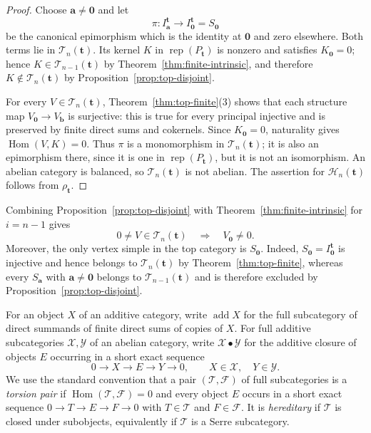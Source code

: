 \documentclass[12pt,reqno]{amsart}
\theoremstyle{definition}
\theoremstyle{remark}
\newcommand{\Rep}{\operatorname{rep}}
\newcommand{\Hom}{\operatorname{Hom}}
\begin{document}
\begin{proof}
Choose $\mathbf a\ne\mathbf0$ and let
\[
\pi:I^{\mathbf t}_{\mathbf a}\longrightarrow
I^{\mathbf t}_{\mathbf0}=S_{\mathbf0}
\]
be the canonical epimorphism which is the identity at $\mathbf0$ and zero
elsewhere.  Both terms lie in $\mathcal T_n(\mathbf t)$.  Its kernel $K$ in
$\Rep(P_{\mathbf t})$ is nonzero and satisfies $K_{\mathbf0}=0$; hence
$K\in\mathcal T_{n-1}(\mathbf t)$ by
Theorem~\ref{thm:finite-intrinsic}, and therefore
$K\notin\mathcal T_n(\mathbf t)$ by Proposition~\ref{prop:top-disjoint}.

For every $V\in\mathcal T_n(\mathbf t)$, Theorem~\ref{thm:top-finite}(3)
shows that each structure map $V_{\mathbf0}\to V_{\mathbf b}$ is surjective:
this is true for every principal injective and is preserved by finite direct
sums and cokernels.  Since $K_{\mathbf0}=0$, naturality gives
$\Hom(V,K)=0$.  Thus $\pi$ is a monomorphism in
$\mathcal T_n(\mathbf t)$; it is also an epimorphism there, since it is one in
$\Rep(P_{\mathbf t})$, but it is not an isomorphism.  An abelian category is
balanced, so $\mathcal T_n(\mathbf t)$ is not abelian.  The assertion for
$\mathcal H_n(\mathbf t)$ follows from $\rho_{\mathbf t}$.
\end{proof}

Combining Proposition~\ref{prop:top-disjoint} with Theorem~\ref{thm:finite-intrinsic} for $i=n-1$ gives
\[
0\ne V\in\mathcal T_n(\mathbf t)
\quad\Longrightarrow\quad
V_{\mathbf0}\ne0.
\]
Moreover, the only vertex simple in the top category is $S_{\mathbf0}$.  Indeed, $S_{\mathbf0}=I^{\mathbf t}_{\mathbf0}$ is injective and hence belongs to $\mathcal T_n(\mathbf t)$ by Theorem~\ref{thm:top-finite}, whereas every $S_{\mathbf a}$ with $\mathbf a\ne\mathbf0$ belongs to $\mathcal T_{n-1}(\mathbf t)$ and is therefore excluded by Proposition~\ref{prop:top-disjoint}.

For an object $X$ of an additive category, write $\operatorname{add}X$ for
the full subcategory of direct summands of finite direct sums of copies of
$X$.  For full additive subcategories $\mathcal X,\mathcal Y$ of an abelian
category, write $\mathcal X\bullet\mathcal Y$ for the additive closure of
objects $E$ occurring in a short exact sequence
\[
0\longrightarrow X\longrightarrow E\longrightarrow Y\longrightarrow0,
\qquad X\in\mathcal X,\quad Y\in\mathcal Y.
\]
We use the standard convention that a pair $(\mathcal T,\mathcal F)$ of full
subcategories is a \emph{torsion pair} if
$\Hom(\mathcal T,\mathcal F)=0$ and every object $E$ occurs in a short exact
sequence $0\to T\to E\to F\to0$ with $T\in\mathcal T$ and
$F\in\mathcal F$.  It is \emph{hereditary} if $\mathcal T$ is closed under
subobjects, equivalently if $\mathcal T$ is a Serre subcategory.
\end{document}
